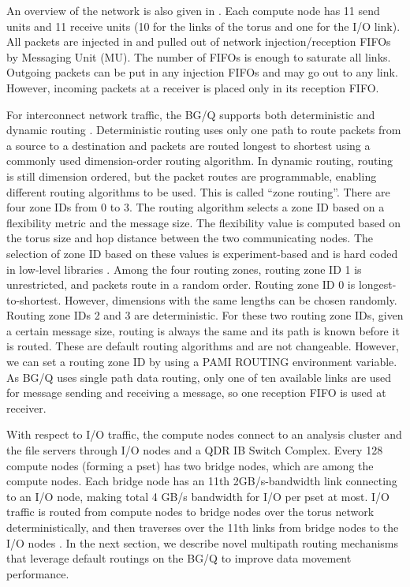 An overview of the network is also given in \cite{Chen:MessagingUnit}. Each compute node has 11 send units and 11 receive units (10 for the links of the torus and one for the I/O link). All packets are injected in and pulled out of network injection/reception FIFOs by Messaging Unit (MU). The number of FIFOs is enough to saturate all links. Outgoing packets can be put in any injection FIFOs and may go out to any link. However, incoming packets at a receiver is placed only in its reception FIFO.

For interconnect network traffic, the BG/Q supports both deterministic and dynamic routing \cite{Chen:BGQ}. Deterministic routing uses only one path to route packets from a source to a destination and packets are routed longest to shortest using a commonly used dimension-order routing algorithm. In dynamic routing, routing is still dimension ordered, but the packet routes are programmable, enabling different routing algorithms to be used. This is called ``zone routing''. There are four zone IDs from 0 to 3. The routing algorithm selects a zone ID based on a flexibility metric and the message size. The flexibility value is computed based on the torus size and hop distance between the two communicating nodes. The selection of zone ID based on these values is experiment-based and is hard coded in low-level libraries \cite{BGQRedbook:Gilge}. Among the four routing zones, routing zone ID 1 is unrestricted, and packets route in a random order. Routing zone ID 0 is longest-to-shortest. However, dimensions with the same lengths can be chosen randomly. Routing zone IDs 2 and 3 are deterministic. For these two routing zone IDs, given a certain message size, routing is always the same and its path is known before it is routed. These are default routing algorithms and are not changeable. However, we can set a routing zone ID by using a PAMI ROUTING environment variable. As BG/Q uses single path data routing, only one of ten available links are used for message sending and receiving a message, so one reception FIFO is used at receiver.

With respect to I/O traffic, the compute nodes connect to an analysis cluster and the file servers through I/O nodes and a QDR IB Switch Complex. Every 128 compute nodes (forming a pset) has two bridge nodes, which are among the compute nodes. Each bridge node has an 11th 2GB/s-bandwidth link connecting to an I/O node, making total 4 GB/s bandwidth for I/O per pset at most. I/O traffic is routed from compute nodes to bridge nodes over the torus network deterministically, and then traverses over the 11th links from bridge nodes to the I/O nodes \cite{Chen:BGQInterconnection}. In the next section, we describe novel multipath routing mechanisms that leverage default routings on the BG/Q to improve data movement performance.